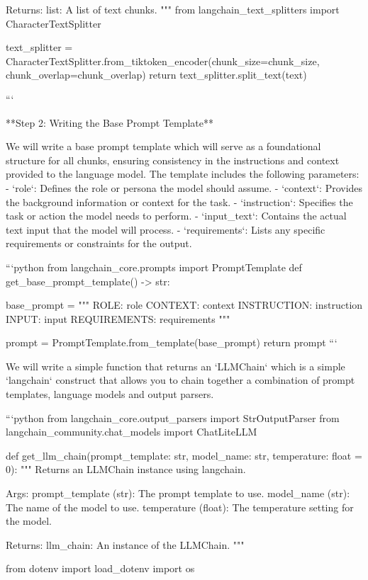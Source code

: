 {{    Returns:
        list: A list of text chunks.
    """
    from langchain_text_splitters import CharacterTextSplitter

    text_splitter = CharacterTextSplitter.from_tiktoken_encoder(chunk_size=chunk_size, chunk_overlap=chunk_overlap)
    return text_splitter.split_text(text)

```

**Step 2: Writing the Base Prompt Template**

We will write a base prompt template which will serve as a foundational structure for all chunks, ensuring consistency in the instructions and context provided to the language model. The template includes the following parameters:
- `role`: Defines the role or persona the model should assume.
- `context`: Provides the background information or context for the task.
- `instruction`: Specifies the task or action the model needs to perform.
- `input_text`: Contains the actual text input that the model will process.
- `requirements`: Lists any specific requirements or constraints for the output.


```python
from langchain_core.prompts import PromptTemplate
def get_base_prompt_template() -> str:
    
    base_prompt = """
    ROLE: {role}
    CONTEXT: {context}
    INSTRUCTION: {instruction}
    INPUT: {input}
    REQUIREMENTS: {requirements}
    """
    
    prompt = PromptTemplate.from_template(base_prompt)
    return prompt
```

We will write a simple function that returns an `LLMChain` which is a simple `langchain` construct that allows you to chain together a combination of prompt templates, language models and output parsers.


```python
from langchain_core.output_parsers import StrOutputParser
from langchain_community.chat_models import ChatLiteLLM

def get_llm_chain(prompt_template: str, model_name: str, temperature: float = 0):
    """
    Returns an LLMChain instance using langchain.

    Args:
        prompt_template (str): The prompt template to use.
        model_name (str): The name of the model to use.
        temperature (float): The temperature setting for the model.

    Returns:
        llm_chain: An instance of the LLMChain.
    """
    
    from dotenv import load_dotenv
    import os

}}
